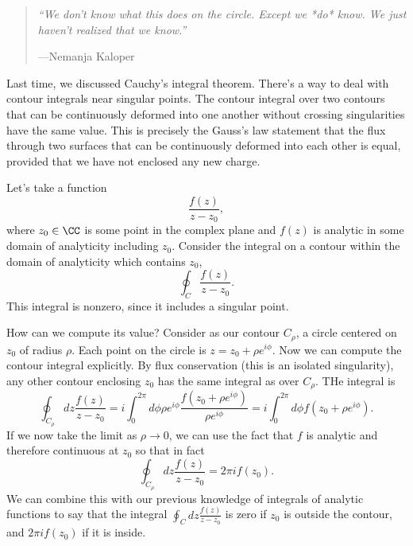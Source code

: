 \begin{quote}
    \textit{``We don't know what this does on the circle. Except we *do* know. We just haven't realized that we know.''}
    
    ---Nemanja Kaloper
\end{quote}

Last time, we discussed Cauchy's integral theorem. There's a way to deal with contour integrals near singular points. The contour integral over two contours that can be continuously deformed into one another without crossing singularities have the same value. This is precisely the Gauss's law statement that the flux through two surfaces that can be continuously deformed into each other is equal, provided that we have not enclosed any new charge.

Let's take a function
\begin{equation}
    \frac{f(z)}{z-z_0},
\end{equation}
where $z_0\in \CC$ is some point in the complex plane and $f(z)$ is analytic in some domain of analyticity including $z_0$. Consider the integral on a contour within the domain of analyticity which contains $z_0$,
\begin{equation}
    \oint_C \frac{f(z)}{z-z_0}.
\end{equation}
This integral is nonzero, since it includes a singular point.

How can we compute its value? Consider as our contour $C_\rho$, a circle centered on $z_0$ of radius $\rho$. Each point on the circle is $z= z_0+ \rho e^{i\phi}$. Now we can compute the contour integral explicitly. By flux conservation (this is an isolated singularity), any other contour enclosing $z_0$ has the same integral as over $C_\rho$. THe integral is
\begin{equation}
    \oint_{C_\rho} dz \frac{f(z)}{z-z_0} = i\int_0^{2\pi} d\phi \rho e^{i\phi} \frac{f(z_0 + \rho e^{i\phi})}{\rho e^{i\phi}} = i \int_0^{2\pi} d\phi f(z_0 + \rho e^{i\phi}).
\end{equation}
If we now take the limit as $\rho\to 0$, we can use the fact that $f$ is analytic and therefore continuous at $z_0$ so that in fact
\begin{equation}
    \oint_{C_\rho} dz \frac{f(z)}{z-z_0} = 2\pi i f(z_0).
\end{equation}
We can combine this with our previous knowledge of integrals of analytic functions to say that the integral $\oint_C dz \frac{f(z)}{z-z_0}$ is zero if $z_0$ is outside the contour, and $2\pi i f(z_0)$ if it is inside.


